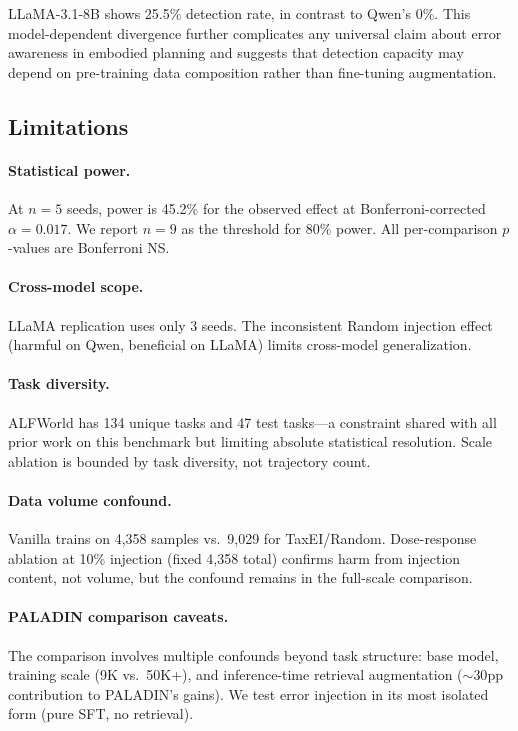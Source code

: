 \documentclass[11pt,a4paper]{article}
\begin{document}
LLaMA-3.1-8B shows 25.5\% detection rate, in contrast to Qwen's 0\%.
This model-dependent divergence further complicates any universal claim about error awareness in embodied planning and suggests that detection capacity may depend on pre-training data composition rather than fine-tuning augmentation.

\subsection{Limitations}

\paragraph{Statistical power.} At $n{=}5$ seeds, power is 45.2\% for the observed effect at Bonferroni-corrected $\alpha{=}0.017$. We report $n{=}9$ as the threshold for 80\% power. All per-comparison $p$-values are Bonferroni NS.

\paragraph{Cross-model scope.} LLaMA replication uses only 3 seeds. The inconsistent Random injection effect (harmful on Qwen, beneficial on LLaMA) limits cross-model generalization.

\paragraph{Task diversity.} ALFWorld has 134 unique tasks and 47 test tasks---a constraint shared with all prior work on this benchmark but limiting absolute statistical resolution. Scale ablation is bounded by task diversity, not trajectory count.

\paragraph{Data volume confound.} Vanilla trains on 4,358 samples vs.\ 9,029 for TaxEI/Random. Dose-response ablation at 10\% injection (fixed 4,358 total) confirms harm from injection content, not volume, but the confound remains in the full-scale comparison.

\paragraph{PALADIN comparison caveats.} The comparison involves multiple confounds beyond task structure: base model, training scale (9K vs.\ 50K+), and inference-time retrieval augmentation (${\sim}30$pp contribution to PALADIN's gains). We test error injection in its most isolated form (pure SFT, no retrieval).
\end{document}

